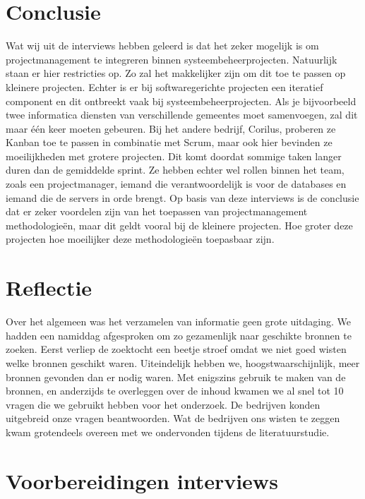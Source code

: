 \documentclass{article}
\begin{document}
    
    \section{Conclusie}
    
    Wat wij uit de interviews hebben geleerd is dat het zeker mogelijk is om projectmanagement te integreren binnen systeembeheerprojecten.
    Natuurlijk staan er hier restricties op. Zo zal het makkelijker zijn om dit toe te passen op kleinere projecten. 
    Echter is er bij softwaregerichte projecten een iteratief component en dit ontbreekt vaak bij systeembeheerprojecten. 
    Als je bijvoorbeeld twee informatica diensten van verschillende gemeentes moet samenvoegen, zal dit maar één keer moeten gebeuren.
    Bij het andere bedrijf, Corilus, proberen ze Kanban toe te passen in combinatie met Scrum, maar ook hier bevinden ze moeilijkheden met grotere projecten.
    Dit komt doordat sommige taken langer duren dan de gemiddelde sprint.
    Ze hebben echter wel rollen binnen het team, zoals een projectmanager, iemand die verantwoordelijk is voor de databases en iemand die de servers in orde brengt.
    Op basis van deze interviews is de conclusie dat er zeker voordelen zijn van het toepassen van projectmanagement methodologieën,
    maar dit geldt vooral bij de kleinere projecten. Hoe groter deze projecten hoe moeilijker deze methodologieën toepasbaar zijn.

    \newpage
    \printbibliography
    \section{Reflectie}
    Over het algemeen was het verzamelen van informatie geen grote uitdaging. We hadden een namiddag afgesproken om zo 
    gezamenlijk naar geschikte bronnen te zoeken. Eerst verliep de zoektocht een beetje stroef omdat we niet goed wisten welke bronnen 
    geschikt waren. Uiteindelijk hebben we, hoogstwaarschijnlijk, meer bronnen gevonden dan er nodig waren. Met 
    enigszins gebruik te maken van de bronnen, en anderzijds te overleggen over de inhoud kwamen we al snel tot 10 vragen die we gebruikt hebben voor het onderzoek. 
    De bedrijven konden uitgebreid onze vragen beantwoorden. Wat de bedrijven ons wisten te zeggen kwam grotendeels overeen 
    met we ondervonden tijdens de literatuurstudie.  
    \section{Voorbereidingen interviews}
\end{document}
